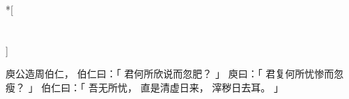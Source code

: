 
\switchcolumn[0]*[\section{}]

庾公造周伯仁，
伯仁曰：「
    君何所欣说而忽肥？
」
庾曰：「
    君复何所忧惨而忽瘦？
」
伯仁曰：「
    吾无所忧，
    直是清虚日来，
    滓秽日去耳。
」

\switchcolumn



